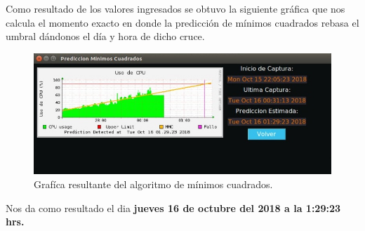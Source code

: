 Como resultado de los valores ingresados se obtuvo la siguiente gráfica que nos calcula el momento exacto en donde la predicción de mínimos cuadrados rebasa el umbral dándonos el día y hora de dicho cruce.

\FloatBarrier
\begin{figure}[htbp!]
		\centering
		    \includegraphics[width=.9 \textwidth]{../images/graficar.jpeg}
		\caption{Grafíca resultante del algoritmo de mínimos cuadrados.}
		\label{image:graficar}
\end{figure}
\FloatBarrier

Nos da como resultado el dia \textbf{ jueves 16 de octubre del 2018 a la 1:29:23 hrs.}